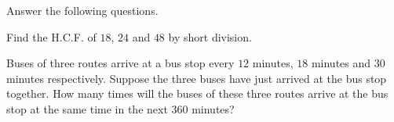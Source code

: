  Answer the following questions.

\begin{subparts}
  \item Find the H.C.F. of $18$, $24$ and $48$ by short division.

  \item Buses of three routes arrive at a bus stop every $12$ minutes, $18$ minutes and $30$ minutes respectively. Suppose the three buses have just arrived at the bus stop together. How many times will the buses of these three routes arrive at the bus stop at the same time in the next $360$ minutes?
\end{subparts}

